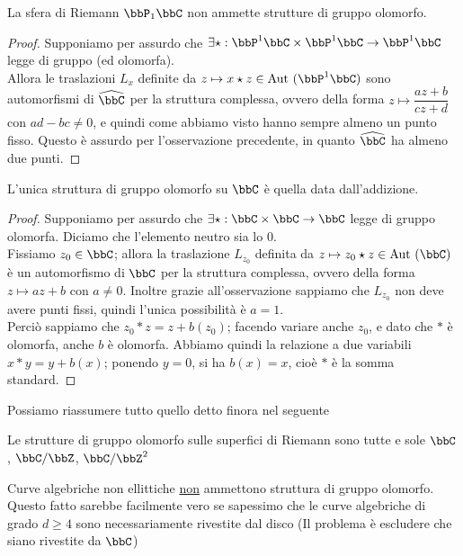 \begin{proposizione}
La sfera di Riemann $\bbP_{1}\bbC $ non ammette strutture di gruppo olomorfo.
\end{proposizione}
\begin{proof}
    Supponiamo per assurdo che $\exists \star: \bbP^1\bbC \times \bbP^1\bbC \rar \bbP^1\bbC$ legge di gruppo (ed olomorfa).\\
    Allora le traslazioni $L_x$ definite da $z \mapsto x \star z \in \Aut(\bbP^1\bbC)$ sono automorfismi di $\hat\bbC$ per la struttura complessa, ovvero della forma $z\mapsto\dfrac{az+b}{cz+d}$ con $ad-bc\neq0$, e quindi come abbiamo visto hanno sempre almeno un punto fisso.
    Questo è assurdo per l'osservazione precedente, in quanto $\hat\bbC$ ha almeno due punti.
\end{proof}

\begin{proposizione}
L'unica struttura di gruppo olomorfo su $\bbC$ è quella data dall'addizione.
\end{proposizione}
\begin{proof}
    Supponiamo per assurdo che $\exists \star: \bbC \times \bbC \rar \bbC$ legge di gruppo olomorfa. Diciamo che l'elemento neutro sia lo $0$.\\
    Fissiamo $z_0\in\bbC$; allora la traslazione $L_{z_0}$ definita da $z \mapsto z_0 \star z \in \Aut(\bbC)$ è un automorfismo di $\bbC$ per la struttura complessa, ovvero della forma $z\mapsto az+b$ con $a\neq0$.
    Inoltre grazie all'osservazione sappiamo che $L_{z_0}$ non deve avere punti fissi, quindi l'unica possibilità è $a=1$.\\
    Perciò sappiamo che $z_0\ast z=z+b(z_0)$; facendo variare anche $z_0$, e dato che $\ast$ è olomorfa, anche $b$ è olomorfa. Abbiamo quindi la relazione a due variabili $x\ast y=y+b(x)$; ponendo $y=0$, si ha $b(x)=x$, cioè $\ast$ è la somma standard.
\end{proof}

Possiamo riassumere tutto quello detto finora nel seguente

\begin{teorema}
    Le strutture di gruppo olomorfo sulle superfici di Riemann sono tutte e sole $\bbC$, $\bbC / \bbZ$, $\bbC / \bbZ^2$
\end{teorema}


\begin{corollario}
  Curve algebriche non ellittiche \underline{non} ammettono struttura di gruppo olomorfo.
  Questo fatto sarebbe facilmente vero se sapessimo che le curve algebriche di grado $d \ge 4$ sono necessariamente rivestite dal disco (Il problema è escludere che siano rivestite da $\bbC$)
\end{corollario}




